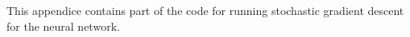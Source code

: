 
This appendice contains part of the code for running stochastic gradient descent for the neural network.


